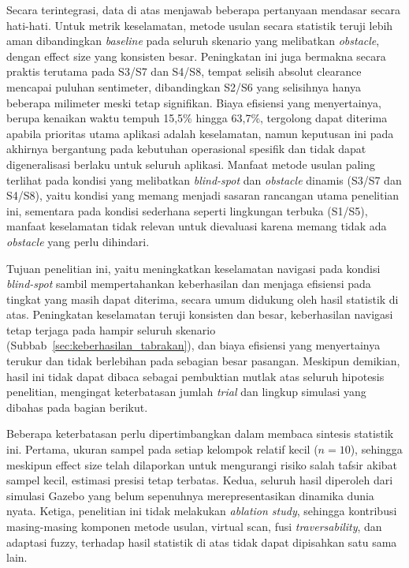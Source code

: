Secara terintegrasi, data di atas menjawab beberapa pertanyaan mendasar
secara hati-hati. Untuk metrik keselamatan, metode usulan secara statistik
teruji lebih aman dibandingkan \textit{baseline} pada seluruh skenario yang
melibatkan \textit{obstacle}, dengan effect size yang konsisten besar.
Peningkatan ini juga bermakna secara praktis terutama pada S3/S7 dan S4/S8,
tempat selisih absolut clearance mencapai puluhan sentimeter, dibandingkan
S2/S6 yang selisihnya hanya beberapa milimeter meski tetap signifikan.
Biaya efisiensi yang menyertainya, berupa kenaikan waktu tempuh 15,5\%
hingga 63,7\%, tergolong dapat diterima apabila prioritas utama aplikasi
adalah keselamatan, namun keputusan ini pada akhirnya bergantung pada
kebutuhan operasional spesifik dan tidak dapat digeneralisasi berlaku
untuk seluruh aplikasi. Manfaat metode usulan paling terlihat pada kondisi
yang melibatkan \textit{blind-spot} dan \textit{obstacle} dinamis (S3/S7
dan S4/S8), yaitu kondisi yang memang menjadi sasaran rancangan utama
penelitian ini, sementara pada kondisi sederhana seperti lingkungan terbuka
(S1/S5), manfaat keselamatan tidak relevan untuk dievaluasi karena memang
tidak ada \textit{obstacle} yang perlu dihindari.

Tujuan penelitian ini, yaitu meningkatkan keselamatan navigasi pada kondisi
\textit{blind-spot} sambil mempertahankan keberhasilan dan menjaga efisiensi
pada tingkat yang masih dapat diterima, secara umum didukung oleh hasil
statistik di atas. Peningkatan keselamatan teruji konsisten dan besar,
keberhasilan navigasi tetap terjaga pada hampir seluruh skenario
(Subbab~\ref{sec:keberhasilan_tabrakan}), dan biaya efisiensi yang
menyertainya terukur dan tidak berlebihan pada sebagian besar pasangan.
Meskipun demikian, hasil ini tidak dapat dibaca sebagai pembuktian mutlak
atas seluruh hipotesis penelitian, mengingat keterbatasan jumlah
\textit{trial} dan lingkup simulasi yang dibahas pada bagian berikut.

Beberapa keterbatasan perlu dipertimbangkan dalam membaca sintesis statistik
ini. Pertama, ukuran sampel pada setiap kelompok relatif kecil ($n=10$),
sehingga meskipun effect size telah dilaporkan untuk mengurangi risiko
salah tafsir akibat sampel kecil, estimasi presisi tetap terbatas. Kedua,
seluruh hasil diperoleh dari simulasi Gazebo yang belum sepenuhnya
merepresentasikan dinamika dunia nyata. Ketiga, penelitian ini tidak
melakukan \textit{ablation study}, sehingga kontribusi masing-masing
komponen metode usulan, virtual scan, fusi \textit{traversability}, dan
adaptasi fuzzy, terhadap hasil statistik di atas tidak dapat dipisahkan
satu sama lain.


